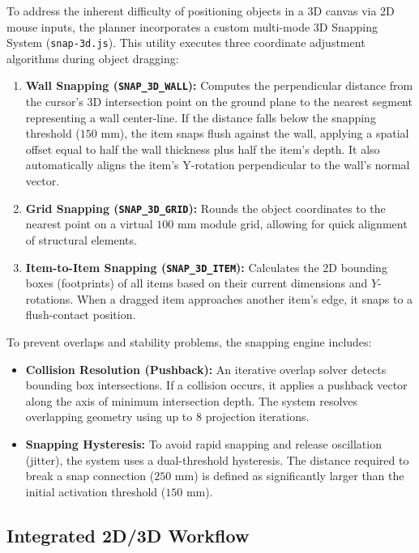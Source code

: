 To address the inherent difficulty of positioning objects in a 3D canvas via 2D mouse inputs, the planner incorporates a custom multi-mode 3D Snapping System (\texttt{snap-3d.js}). This utility executes three coordinate adjustment algorithms during object dragging:
\begin{enumerate}
    \item \textbf{Wall Snapping (\texttt{SNAP\_3D\_WALL}):} Computes the perpendicular distance from the cursor's 3D intersection point on the ground plane to the nearest segment representing a wall center-line. If the distance falls below the snapping threshold ($150\text{ mm}$), the item snaps flush against the wall, applying a spatial offset equal to half the wall thickness plus half the item's depth. It also automatically aligns the item's Y-rotation perpendicular to the wall's normal vector.
    \item \textbf{Grid Snapping (\texttt{SNAP\_3D\_GRID}):} Rounds the object coordinates to the nearest point on a virtual $100\text{ mm}$ module grid, allowing for quick alignment of structural elements.
    \item \textbf{Item-to-Item Snapping (\texttt{SNAP\_3D\_ITEM}):} Calculates the 2D bounding boxes (footprints) of all items based on their current dimensions and $Y$-rotations. When a dragged item approaches another item's edge, it snaps to a flush-contact position.
\end{enumerate}

To prevent overlaps and stability problems, the snapping engine includes:
\begin{itemize}
    \item \textbf{Collision Resolution (Pushback):} An iterative overlap solver detects bounding box intersections. If a collision occurs, it applies a pushback vector along the axis of minimum intersection depth. The system resolves overlapping geometry using up to 8 projection iterations.
    \item \textbf{Snapping Hysteresis:} To avoid rapid snapping and release oscillation (jitter), the system uses a dual-threshold hysteresis. The distance required to break a snap connection ($250\text{ mm}$) is defined as significantly larger than the initial activation threshold ($150\text{ mm}$).
\end{itemize}

\subsection{Integrated 2D/3D Workflow}

